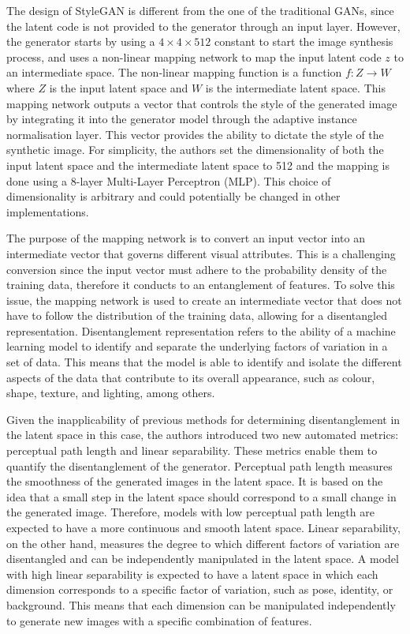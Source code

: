\noindent The design of StyleGAN is different from the one of the traditional GANs, since the latent code is not provided to the generator through an input layer. However, the generator starts by using a $4\times4\times512$ constant to start the image synthesis process, and uses a non-linear mapping network to map the input latent code $z$ to an intermediate space. 
The non-linear mapping function is a function $f:Z\rightarrow W$ where $Z$ is the input latent space and $W$ is the intermediate latent space. This mapping network outputs a vector that controls the style of the generated image by integrating it into the generator model through the adaptive instance normalisation layer. This vector provides the ability to dictate the style of the synthetic image.
For simplicity, the authors set the dimensionality of both the input latent space and the intermediate latent space to \num{512} and the mapping is done using a \num{8}-layer Multi-Layer Perceptron (MLP). This choice of dimensionality is arbitrary and could potentially be changed in other implementations.

\noindent The purpose of the mapping network is to convert an input vector into an intermediate vector that governs different visual attributes. This is a challenging conversion since the input vector must adhere to the probability density of the training data, therefore it conducts to an entanglement of features. To solve this issue, the mapping network is used to create an intermediate vector that does not have to follow the distribution of the training data, allowing for a disentangled representation. Disentanglement representation refers to the ability of a machine learning model to identify and separate the underlying factors of variation in a set of data. This means that the model is able to identify and isolate the different aspects of the data that contribute to its overall appearance, such as colour, shape, texture, and lighting, among others.

\noindent Given the inapplicability of previous methods for determining disentanglement in the latent space in this case, the authors introduced two new automated metrics: perceptual path length and linear separability. These metrics enable them to quantify the disentanglement of the generator. Perceptual path length measures the smoothness of the generated images in the latent space. 
It is based on the idea that a small step in the latent space should correspond to a small change in the generated image. Therefore, models with low perceptual path length are expected to have a more continuous and smooth latent space. Linear separability, on the other hand, measures the degree to which different factors of variation are disentangled and can be independently manipulated in the latent space. A model with high linear separability is expected to have a latent space in which each dimension corresponds to a specific factor of variation, such as pose, identity, or background. This means that each dimension can be manipulated independently to generate new images with a specific combination of features.


